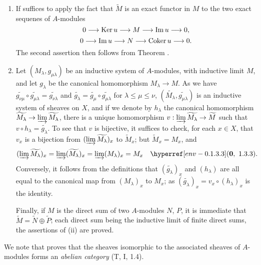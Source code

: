 \begin{enumerate}[label=(\roman*)]
  \item If suffices to apply the fact that $\widetilde{M}$ is an exact functor in $M$
         to the two exact sequenes of $A$-modules
        \[
          0\longrightarrow{\mathop{\mathrm{Ker}}\nolimits}\, u\longrightarrow M\longrightarrow{\mathop{\mathrm{Im}}\nolimits}\, u\longrightarrow 0,
        \]
        \[
          0\longrightarrow{\mathop{\mathrm{Im}}\nolimits}\, u\longrightarrow N\longrightarrow{\mathop{\mathrm{Coker}}\nolimits}\, u\longrightarrow 0.
        \]
        The second assertion then follows from Theorem .
  \item Let $(M_\lambda,g_{\mu\lambda})$ be an inductive system of $A$-modules, with
        inductive limit $M$, and let $g_\lambda$ be the canonical homomorphism
        $M_\lambda\to M$. As we have
        $\widetilde{g_{\nu\mu}}\circ\widetilde{g_{\mu\lambda}}=\widetilde{g_{\nu\lambda}}$
        and $\widetilde{g_\lambda}=\widetilde{g_\mu}\circ\widetilde{g_{\mu\lambda}}$ for
        $\lambda\leqslant\mu\leqslant\nu$,
        $(\widetilde{M_\lambda},\widetilde{g_{\mu\lambda}})$ is an inductive system of
        sheaves on $X$, and if we denote by $h_\lambda$ the canonical homomorphism
        $\widetilde{M_\lambda}\to\varinjlim\widetilde{M_\lambda}$, there is a unique
        homomorphism $v:\varinjlim\widetilde{M_\lambda}\to\widetilde{M}$ such that
        $v\circ h_\lambda=\widetilde{g_\lambda}$. To see that $v$ is bijective, it suffices
        to check, for each $x\in X$, that $v_x$ is a bijection from
        $(\varinjlim\widetilde{M_\lambda})_x$ to $\widetilde{M}_x$; but
        $\widetilde{M}_x=M_x$, and
        \[
          (\varinjlim\widetilde{M_\lambda})_x=\varinjlim(\widetilde{M_\lambda})_x
          =\varinjlim(M_\lambda)_x=M_x\quad\pref{env}{1.3.3}.
        \]
        Conversely, it follows from the definitions that $(\widetilde{g_\lambda})_x$ and
        $(h_\lambda)$ are all equal to the canonical map from $(M_\lambda)_x$ to $M_x$; as
        $(\widetilde{g_\lambda})_x=v_x\circ(h_\lambda)_x$ is the identity.

        Finally, if $M$ is the direct sum of two $A$-modules $N$, $P$, it is immediate that
        $\widetilde{M}=\widetilde{N}\oplus\widetilde{P}$; each direct sum being the inductive
        limit of finite direct sums, the assertions of (ii) are proved.
\end{enumerate}

We note that  proves that the sheaves isomorphic to the associated sheaves
of $A$-modules forms an \emph{abelian category} (T, I, 1.4).

